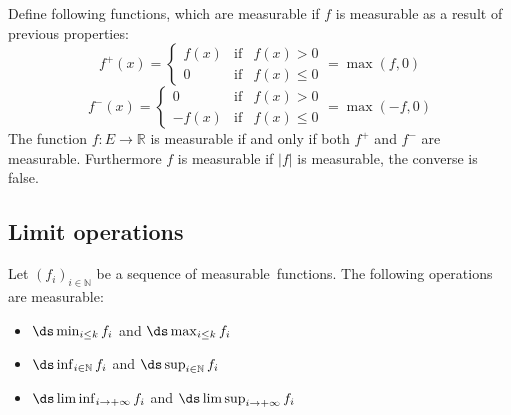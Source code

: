         \begin{theorem}
		Define following functions, which are measurable if $f$ is measurable as a result of previous properties:
		\begin{equation}
			\label{lebesgue:positive_part}
                	f^+(x) = \left\{
                	\begin{array}{ccc}
				f(x)&\text{if}&f(x)>0\\
		                0&\text{if}&f(x)\leq0
			\end{array}\right. = \max(f,0)
		\end{equation}
	        \begin{equation}
			\label{lebesgue:negative_part}
	                f^-(x) = \left\{
	                \begin{array}{ccc}
				0&\text{if}&f(x)>0\\
		                -f(x)&\text{if}&f(x)\leq0
			\end{array}\right. = \max(-f,0)
		\end{equation}
	        The function $f:E\rightarrow\mathbb{R}$ is measurable if and only if both $f^+$ and $f^-$ are measurable. Furthermore $f$ is measurable if $|f|$ is measurable, the converse is false.
	\end{theorem}

\subsection{Limit operations}
 
    	\begin{property}
		Let $(f_i)_{i\in\mathbb{N}}$ be a sequence of measurable\footnotemark\ functions. The following operations are measurable:
	        \begin{itemize}
			\item $\ds\min_{i\leq k}f_i$ and $\ds\max_{i\leq k}f_i$
	                \item $\ds\inf_{i\in\mathbb{N}}f_i$ and $\ds\sup_{i\in\mathbb{N}}f_i$
	                \item $\ds\liminf_{i\rightarrow+\infty}f_i$ and $\ds\limsup_{i\rightarrow+\infty}f_i$
		\end{itemize}
	\end{property}
        
